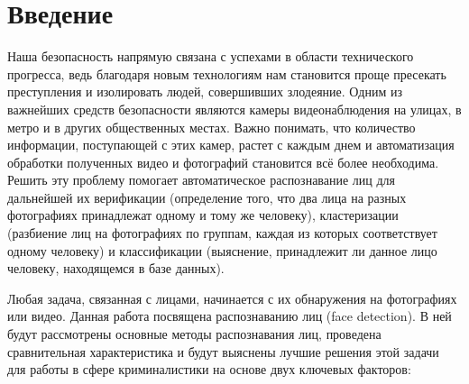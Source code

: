 \documentclass[14pt]{matmex-diploma-custom}
\begin{document}


\maketitle
\tableofcontents

\section*{Введение} 
    
   Наша безопасность напрямую связана с успехами в области технического прогресса, ведь благодаря новым технологиям нам становится проще пресекать преступления и изолировать людей, совершивших злодеяние. Одним из важнейших средств безопасности являются камеры видеонаблюдения на улицах, в метро и в других общественных местах. Важно понимать, что количество информации, поступающей с этих камер, растет с каждым днем и автоматизация обработки полученных видео и фотографий становится всё более необходима.
    Решить эту проблему помогает автоматическое распознавание лиц для дальнейшей их верификации (определение того, что два лица на разных фотографиях принадлежат одному и тому же человеку), кластеризации (разбиение лиц на фотографиях по группам, каждая из которых соответствует одному человеку) и классификации (выяснение, принадлежит ли данное лицо человеку, находящемся в базе данных). \par
    Любая задача, связанная с лицами, начинается с их обнаружения на фотографиях или видео. Данная работа посвящена распознаванию лиц (face detection). В ней будут рассмотрены основные методы распознавания лиц, проведена сравнительная характеристика и будут выяснены лучшие решения этой задачи для работы в сфере криминалистики на основе двух ключевых факторов:
    
\end{document}
